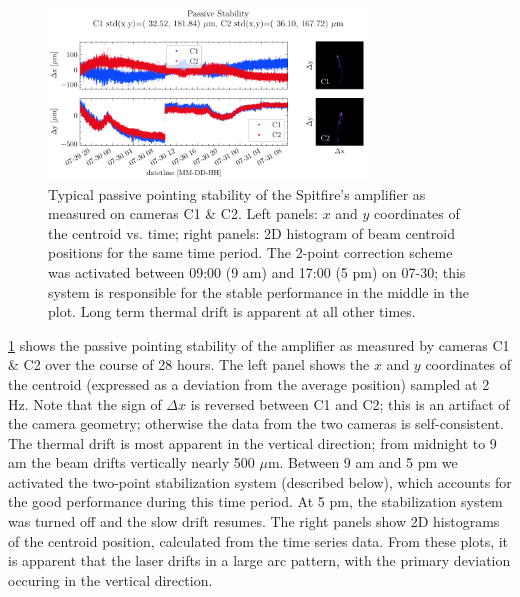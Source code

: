 \begin{figure}
	\centering
	\includegraphics[width=0.75\textwidth]{figures/chap2/Stability_NoCorrection.pdf}
	\caption{Typical passive pointing stability of the Spitfire's amplifier as measured on cameras C1 \& C2. Left panels: $x$ and $y$ coordinates of the centroid vs. time; right panels: 2D histogram of beam centroid positions for the same time period. The 2-point correction scheme was activated between 09:00 (9 am) and 17:00 (5 pm) on 07-30; this system is responsible for the stable performance in the middle in the plot. Long term thermal drift is apparent at all other times.}
	\label{fig:guidestar_passive_stability}
\end{figure}

\cref{fig:guidestar_passive_stability} shows the passive pointing stability of the amplifier as measured by cameras C1 \& C2 over the course of 28 hours. The left panel shows the $x$ and $y$ coordinates of the centroid (expressed as a deviation from the average position) sampled at 2 Hz. Note that the sign of $\Delta x$ is reversed between C1 and C2; this is an artifact of the camera geometry; otherwise the data from the two cameras is self-consistent. The thermal drift is most apparent in the vertical direction; from midnight to 9 am the beam drifts vertically nearly 500 $\mu$m. Between 9 am and 5 pm we activated the two-point stabilization system (described below), which accounts for the good performance during this time period. At 5 pm, the stabilization system was turned off and the slow drift resumes. The right panels show 2D histograms of the centroid position, calculated from the time series data. From these plots, it is apparent that the laser drifts in a large arc pattern, with the primary deviation occuring in the vertical direction.


